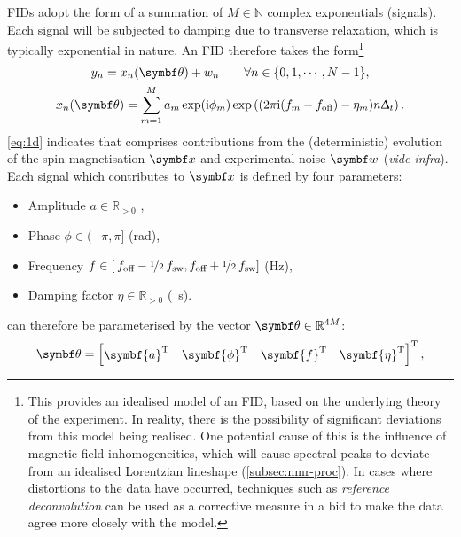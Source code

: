 \acp{FID} adopt the form of a summation of $M \in \mathbb{N}$ complex
exponentials (signals). Each signal will be subjected to damping due to
transverse relaxation, which is typically exponential in nature. An \ac{FID}
therefore takes the form\footnote{
    This provides an idealised model of an \ac{FID}, based on the
    underlying theory of the experiment. In reality, there is the possibility
    of significant deviations from this model being realised. One potential
    cause of this is the influence of magnetic field inhomogeneities, which
    will cause spectral peaks to deviate from an idealised Lorentzian lineshape
    (\cref{subsec:nmr-proc}). In cases where distortions to the data have
    occurred, techniques such as \emph{reference deconvolution}\cite{Morris1997}
    can be used as a corrective measure in a bid to make the data agree more
    closely with the model.
}
\begin{subequations}
    \begin{gather}
        y_n = x_n(\bth) + w_n \quad
            \quad \forall n \in \lbrace 0, 1, \cdots, N - 1 \rbrace,
            \label{eq:y=x+w} \\
        x_n(\bth) =
        \sumM \amexpphim \exp\left(
            (2 \pi \iu (f_m - \foff)- \eta_m ) n \Dt
        \right).
        \label{eq:x}
    \end{gather}
    \label{eq:1d}%
\end{subequations}%
\cref{eq:1d} indicates that  comprises contributions from the
(deterministic) evolution of the spin magnetisation $\bx$ and experimental
noise $\bw$ (\emph{vide infra}). Each signal which contributes to $\bx$ is
defined by four parameters:
\begin{itemize}
    \item Amplitude $a \in \mathbb{R}_{>0}$ ,
    \label{pg:param-constraints}
    \item Phase $\phi \in (-\pi, \pi]$ (\unit{\radian}),
    \item Frequency $f \in \left[\hspace*{2pt}f_{\text{off}} - \nicefrac{1}{2} \hspace*{2pt}
        f_{\mathrm{sw}}, f_{\text{off}} + \nicefrac{1}{2} \hspace*{2pt}f_{\mathrm{sw}} \right]$ (\unit{\hertz}),
    \item Damping factor $\eta \in \mathbb{R}_{>0}$ (\unit{\per\second}).
\end{itemize}%
 can therefore be parameterised by the vector $\bth \in
\mathbb{R}^{4M}$:
\begin{equation}
    \bth =
    \begin{bmatrix}
        \symbf{a}\T & \symbf{\phi}\T & \symbf{f}\T & \symbf{\eta}\T
    \end{bmatrix}\T,
\end{equation}
